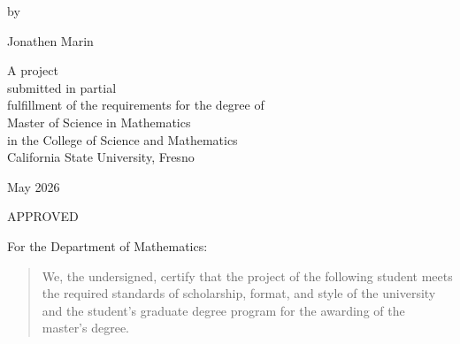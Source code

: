 \documentclass[12pt,leqno]{article}\usepackage[pdftex]{graphicx}\usepackage[dvipsnames]{xcolor}
\theoremstyle{remark}
\begin{document}
\vskip 2in

\begin{center}
by
\end{center}

\begin{center}
Jonathen Marin%
\end{center}

\vskip 2in

\begin{center}
A project \\[6pt]
submitted in partial \\[6pt]
fulfillment of the requirements for the degree of \\[6pt]
Master of Science in Mathematics \\[6pt]
in the College of Science and Mathematics \\[6pt]
California State University, Fresno
\end{center}

\begin{center}
May 2026 %
\end{center}
\setcounter{page}{1}
\thispagestyle{empty}
\newpage

\begin{center}
APPROVED
\end{center}

\begin{center}
For the Department of Mathematics:
\end{center}


\noindent
\begin{quote}
We, the undersigned, certify that the project of the following student meets the required standards of scholarship, format, and style of the university and the student's graduate degree program for the awarding of the master's degree.
\end{quote}
\end{document}

